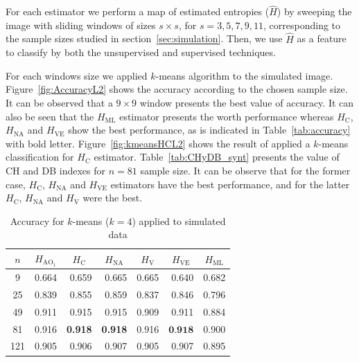 \documentclass[journal]{IEEEtran}
\begin{document}

For each estimator we perform a map of estimated entropies ($\widehat{H}$) by sweeping the image with sliding windows of sizes $s\times s$, for $s=3,5,7,9,11$, corresponding to the sample sizes studied in section~\ref{sec:simulation}. Then, we use $\widehat{H}$ as a feature to classify by both the unsupervised and supervised techniques.

For each windows size we applied $k$-means algorithm to the simulated image. Figure~\ref{fig:AccuracyL2} shows the accuracy according to the chosen sample size. It can be observed that a $9 \times 9$ window presents the best value of accuracy. It can also be seen that the $H_{\text{ML}}$ estimator presents the worth performance whereas $H_\text{C}$, $H_{\text{NA}}$ and $H_{\text{VE}}$ show the best performance, as is indicated in Table~\ref{tab:accuracy} with bold letter. Figure~\ref{fig:kmeansHCL2} shows the result of applied a $k$-means classification for $H_\text{C}$ estimator. Table~\ref{tab:CHyDB_synt} presents the value of CH and DB indexes for $n=81$ sample size. It can be observe that for the former case, $H_\text{C}$, $H_{\text{NA}}$ and $H_{\text{VE}}$ estimators have the best performance, and for the latter $H_\text{C}$, $H_{\text{NA}}$ and $H_{\text{V}}$ were the best.

\begin{table}[htbp]
	\centering
	\caption{Accuracy for $k$-means ($k=4$) applied to simulated data}
	\label{tab:accuracy}
	\begin{tabular}{crrrrrr}
		\midrule
		$n$     & \multicolumn{1}{c}{$H_{{\text{AO}}_1}$} & \multicolumn{1}{c}{$H_\text{C}$} & \multicolumn{1}{c}{$H_{\text{NA}}$} & \multicolumn{1}{c}{$H_\text{V}$} & \multicolumn{1}{c}{$H_{\text{VE}}$} & \multicolumn{1}{c}{$H_{\text{ML}}$}\\
		\midrule
		9 & 0.664 & 0.659 & 0.665 & 0.665 & 0.640 & 0.682 \\
		25  & 0.839 & 0.855 & 0.859 & 0.837 & 0.846 & 0.796 \\
		49  & 0.911 & 0.915 & 0.915 & 0.909 & 0.911 & 0.884 \\
		81  & 0.916 & \textbf{0.918} & \textbf{0.918} & 0.916 & $\textbf{0.918}$ & 0.900 \\
		121 & 0.905 & 0.906 & 0.907 & 0.905 & 0.907 & 0.895 \\
		\bottomrule
	\end{tabular}%
	\label{tab:addlabel}%
\end{table}
\end{document}
